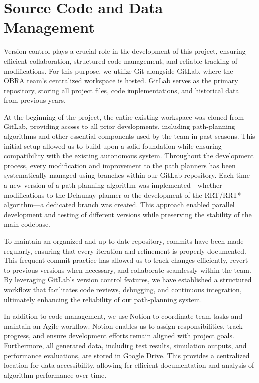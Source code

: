 \documentclass[a4paper,11pt]{report}
\begin{document}
\section{Source Code and Data Management}

Version control plays a crucial role in the development of this project, ensuring efficient collaboration, structured code management, and reliable tracking of modifications. For this purpose, we utilize Git alongside GitLab, where the OBRA team's centralized workspace is hosted. GitLab serves as the primary repository, storing all project files, code implementations, and historical data from previous years.

At the beginning of the project, the entire existing workspace was cloned from GitLab, providing access to all prior developments, including path-planning algorithms and other essential components used by the team in past seasons. This initial setup allowed us to build upon a solid foundation while ensuring compatibility with the existing autonomous system. Throughout the development process, every modification and improvement to the path planners has been systematically managed using branches within our GitLab repository. Each time a new version of a path-planning algorithm was implemented—whether modifications to the Delaunay planner or the development of the RRT/RRT* algorithm—a dedicated branch was created. This approach enabled parallel development and testing of different versions while preserving the stability of the main codebase.

To maintain an organized and up-to-date repository, commits have been made regularly, ensuring that every iteration and refinement is properly documented. This frequent commit practice has allowed us to track changes efficiently, revert to previous versions when necessary, and collaborate seamlessly within the team. By leveraging GitLab's version control features, we have established a structured workflow that facilitates code reviews, debugging, and continuous integration, ultimately enhancing the reliability of our path-planning system.

In addition to code management, we use Notion to coordinate team tasks and maintain an Agile workflow. Notion enables us to assign responsibilities, track progress, and ensure development efforts remain aligned with project goals. Furthermore, all generated data, including test results, simulation outputs, and performance evaluations, are stored in Google Drive. This provides a centralized location for data accessibility, allowing for efficient documentation and analysis of algorithm performance over time.
\end{document}
